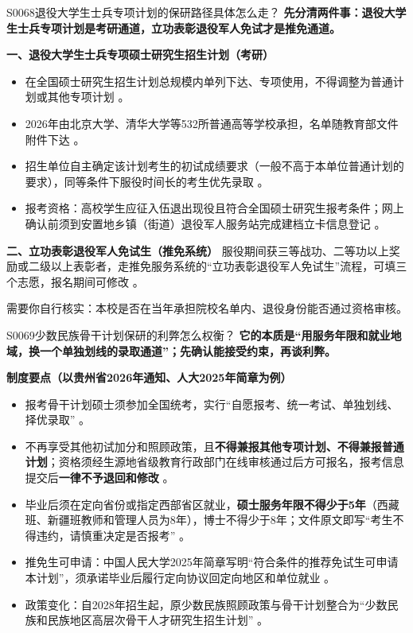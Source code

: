 \begin{qa}{S0068}{退役大学生士兵专项计划的保研路径具体怎么走？}
\textbf{先分清两件事：退役大学生士兵专项计划是考研通道，立功表彰退役军人免试才是推免通道。}

\textbf{一、退役大学生士兵专项硕士研究生招生计划（考研）}
\begin{itemize}
  \item 在全国硕士研究生招生计划总规模内单列下达、专项使用，不得调整为普通计划或其他专项计划 。
  \item 2026年由北京大学、清华大学等532所普通高等学校承担，名单随教育部文件附件下达 。
  \item 招生单位自主确定该计划考生的初试成绩要求（一般不高于本单位普通计划的要求），同等条件下服役时间长的考生优先录取 。
  \item 报考资格：高校学生应征入伍退出现役且符合全国硕士研究生报考条件；网上确认前须到安置地乡镇（街道）退役军人服务站完成建档立卡信息登记 。
\end{itemize}

\textbf{二、立功表彰退役军人免试生（推免系统）}
服役期间获三等战功、二等功以上奖励或二级以上表彰者，走推免服务系统的“立功表彰退役军人免试生”流程，可填三个志愿，报名期间可修改 。

需要你自行核实：本校是否在当年承担院校名单内、退役身份能否通过资格审核。
\end{qa}

\begin{qa}{S0069}{少数民族骨干计划保研的利弊怎么权衡？}
\textbf{它的本质是“用服务年限和就业地域，换一个单独划线的录取通道”；先确认能接受约束，再谈利弊。}

\textbf{制度要点（以贵州省2026年通知、人大2025年简章为例）}
\begin{itemize}
  \item 报考骨干计划硕士须参加全国统考，实行“自愿报考、统一考试、单独划线、择优录取” 。
  \item 不再享受其他初试加分和照顾政策，且\textbf{不得兼报其他专项计划、不得兼报普通计划}；资格须经生源地省级教育行政部门在线审核通过后方可报名，报考信息提交后\textbf{一律不予退回和修改} 。
  \item 毕业后须在定向省份或指定西部省区就业，\textbf{硕士服务年限不得少于5年}（西藏班、新疆班教师和管理人员为8年），博士不得少于8年；文件原文即写“考生不得违约，请慎重决定是否报考” 。
  \item 推免生可申请：中国人民大学2025年简章写明“符合条件的推荐免试生可申请本计划”，须承诺毕业后履行定向协议回定向地区和单位就业 。
  \item 政策变化：自2028年招生起，原少数民族照顾政策与骨干计划整合为“少数民族和民族地区高层次骨干人才研究生招生计划” 。
\end{itemize}
\end{qa}

